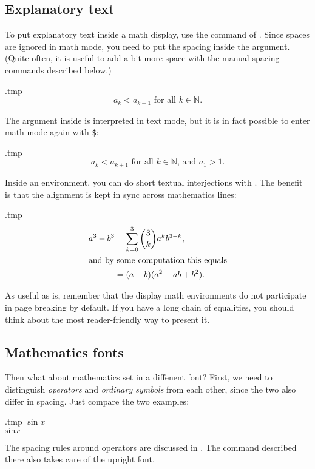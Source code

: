 %
%
\subsection{Explanatory text}

To put explanatory text inside a math display, use the  command of .
Since spaces are ignored in math mode, you need to put the spacing inside the argument.
(Quite often, it is useful to add a bit more space with the manual spacing commands described below.)
%
\begin{VerbatimOut}{\jobname.tmp}
\[
a_k < a_{k+1}
\text{ for all } k \in \mathbb N.
\]
\end{VerbatimOut}
\ShowExample
%
The argument inside  is interpreted in text mode,
but it is in fact possible to enter math mode again with \verb|$|:
%
\begin{VerbatimOut}{\jobname.tmp}
\[
a_k < a_{k+1}
\text{ for all $k \in \mathbb N$, and }
a_1 > 1.
\]
\end{VerbatimOut}
\ShowExampleBelow

Inside an  environment, you can do short textual interjections with .
The benefit is that the alignment is kept in sync across mathematics lines:
%
\begin{VerbatimOut}{\jobname.tmp}
\begin{align}
a^3 - b^3
&= \sum_{k=0}^3 \binom 3 k a^k b^{3-k},\\
\intertext{and by some computation this equals}
&= (a-b)(a^2 + ab + b^2).
\end{align}
\end{VerbatimOut}
\ShowExampleBelow

\begin{practices}
As useful as  is,
remember that the display math environments do not participate in page breaking by default.
If you have a long chain of equalities,
you should think about the most reader-friendly way to present it.
\end{practices}


%
%
\subsection{Mathematics fonts}

Then what about mathematics set in a diffenent font?
First, we need to distinguish \emph{operators} and \emph{ordinary symbols} from each other,
since the two also differ in spacing.
Just compare the two examples:
%
\begin{VerbatimOut}{\jobname.tmp}
$\sin x$\\
$\mathrm{sin} x$
\end{VerbatimOut}
\ShowExample
%
The spacing rules around operators are discussed in .
The  command described there also takes care of the upright font.

